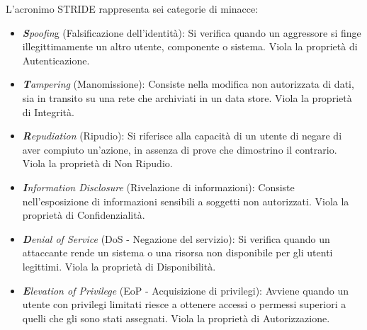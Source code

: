 L'acronimo STRIDE rappresenta sei categorie di minacce:
\begin{itemize}
    \item \textit{\textbf{S}poofin}g (Falsificazione dell'identità): Si verifica quando un aggressore si finge illegittimamente un altro utente, componente o sistema. Viola la proprietà di Autenticazione.
    \item \textit{\textbf{T}ampering} (Manomissione): Consiste nella modifica non autorizzata di dati, sia in transito su una rete che archiviati in un data store. Viola la proprietà di Integrità.
    \item \textit{\textbf{R}epudiation} (Ripudio): Si riferisce alla capacità di un utente di negare di aver compiuto un'azione, in assenza di prove che dimostrino il contrario. Viola la proprietà di Non Ripudio.
    \item \textit{\textbf{I}nformation Disclosure} (Rivelazione di informazioni): Consiste nell'esposizione di informazioni sensibili a soggetti non autorizzati. Viola la proprietà di Confidenzialità.
    \item \textit{\textbf{D}enial of Service} (DoS - Negazione del servizio): Si verifica quando un attaccante rende un sistema o una risorsa non disponibile per gli utenti legittimi. Viola la proprietà di Disponibilità.
    \item \textit{\textbf{E}levation of Privilege} (EoP - Acquisizione di privilegi): Avviene quando un utente con privilegi limitati riesce a ottenere accessi o permessi superiori a quelli che gli sono stati assegnati. Viola la proprietà di Autorizzazione.
\end{itemize}

